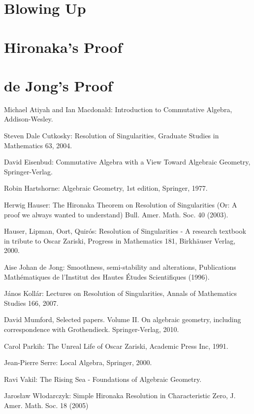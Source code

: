 \documentclass[12pt,a4paper,leqno]{article}
\theoremstyle{plain}
\theoremstyle{definition}
\theoremstyle{remark}
\begin{document}
\section{Blowing Up}\label{BlowUp}

\section{Hironaka's Proof}\label{HirRes}

\section{de Jong's Proof}\label{deJongRes}

\begin{thebibliography}{5, style=alpha}

Michael Atiyah and Ian Macdonald: Introduction to Commutative Algebra, Addison-Wesley.

Steven Dale Cutkosky: Resolution of Singularities, Graduate Studies in Mathematics 63, 2004.

David Eisenbud: Commutative Algebra with a View Toward Algebraic Geometry, Springer-Verlag.

Robin Hartshorne: Algebraic Geometry, 1st edition, Springer, 1977.

Herwig Hauser: The Hironaka Theorem on Resolution of Singularities (Or: A proof we always wanted to understand) Bull. Amer. Math. Soc. 40 (2003).

Hauser, Lipman, Oort, Quirós: Resolution of Singularities - A research textbook in tribute to Oscar Zariski, Progress in Mathematics 181, Birkhäuser Verlag, 2000.

Aise Johan de Jong: Smoothness, semi-stability and alterations, Publications Mathématiques de l’Institut des Hautes Études Scientifiques (1996).

János Kollár: Lectures on Resolution of Singularities, Annals of Mathematics Studies 166, 2007.

David Mumford, Selected papers. Volume II. On algebraic geometry, including correspondence with Grothendieck. Springer-Verlag, 2010.

 Carol Parkih: The Unreal Life of Oscar Zariski, Academic Press Inc, 1991.

Jean-Pierre Serre: Local Algebra, Springer, 2000.

Ravi Vakil: The Rising Sea - Foundations of Algebraic Geometry.

Jaros\l{}aw W\l{}odarczyk: Simple Hironaka Resolution in Characteristic Zero, J. Amer. Math. Soc. 18 (2005)
\end{thebibliography}
\end{document}

